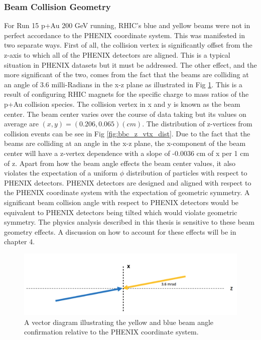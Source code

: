 \subsubsection{Beam Collision Geometry}
For Run 15 p+Au 200 GeV running, RHIC's blue and yellow beams were not in perfect accordance to the PHENIX coordinate system. This was manifested in two separate ways.
First of all, the collision vertex is significantly offset from the z-axis to which all of the PHENIX detectors are aligned. This is a typical situation in PHENIX datasets but it must be addressed. The other effect, and the more significant of the two, comes from the fact that the beams are colliding at an angle of 3.6 milli-Radians in the x-z plane as illustrated in Fig \ref{fig:beam_angle}. This is a result of configuring RHIC magnets for the specific charge to mass ratios of the p+Au collision species.
The collision vertex in x and y is known as the beam center. The beam center varies over the course of data taking but its values on average are $(x,y) = (0.206,0.065) (cm)$. The distribution of z-vertices from collision events can be see in Fig \ref{fig:bbc_z_vtx_dist}. Due to the fact that the beams are colliding at an angle in the x-z plane, the x-component of the beam center will have a z-vertex dependence with a slope of -0.0036 cm of x per 1 cm of z.
Apart from how the beam angle effects the beam center values, it also violates the expectation of a uniform $\phi$ distribution of particles with respect to PHENIX detectors. PHENIX detectors are designed and aligned with respect to the PHENIX coordinate system with the expectation of geometric symmetry. A significant beam collision angle with respect to PHENIX detectors would be equivalent to PHENIX detectors being tilted which would violate geometric symmetry.
The physics analysis described in this thesis is sensitive to these beam geometry effects. A discussion on how to account for these effects will be in chapter 4.

\begin{figure}[h!]
\begin{center}
\includegraphics[width=0.85\linewidth]{figs/beam_angle.png}
\caption{A vector diagram illustrating the yellow and blue beam angle confirmation relative to the PHENIX coordinate system.}\label{fig:beam_angle}

\end{center}
\end{figure}

